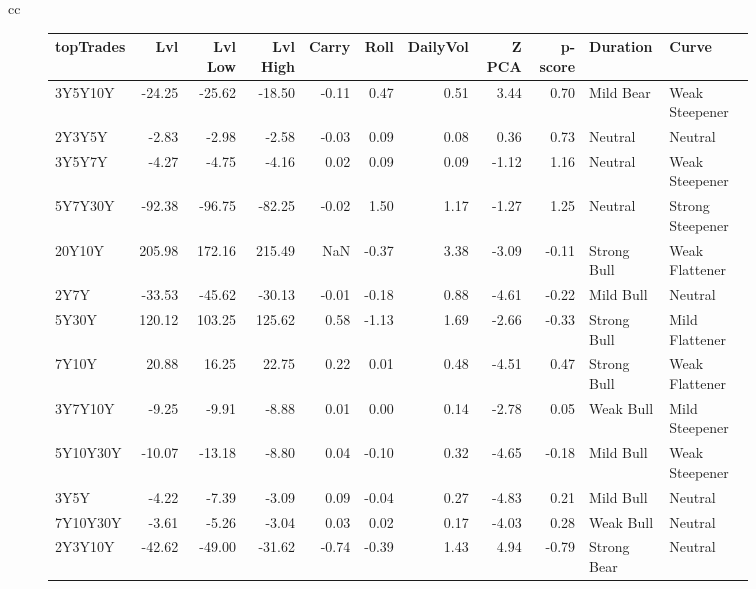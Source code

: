 \documentclass[a4paper,oneside]{report}
\begin{document}
\begin{figure}[htbp]
\begin{tabular}[c]{cc}
\begin{subfigure}[c]{0.5\textwidth}
\begin{adjustbox}{max width=\textwidth}
\begin{tabular}{lrrrrrrrrll}
\hline
topTrades &     Lvl &  Lvl Low &  Lvl High &  Carry &  Roll &  DailyVol &  Z PCA &  p-score &     Duration &             Curve \\
\hline
  3Y5Y10Y &  -24.25 &   -25.62 &    -18.50 &  -0.11 &  0.47 &      0.51 &   3.44 &     0.70 &    Mild Bear &    Weak Steepener \\
   2Y3Y5Y &   -2.83 &    -2.98 &     -2.58 &  -0.03 &  0.09 &      0.08 &   0.36 &     0.73 &      Neutral &           Neutral \\
   3Y5Y7Y &   -4.27 &    -4.75 &     -4.16 &   0.02 &  0.09 &      0.09 &  -1.12 &     1.16 &      Neutral &    Weak Steepener \\
  5Y7Y30Y &  -92.38 &   -96.75 &    -82.25 &  -0.02 &  1.50 &      1.17 &  -1.27 &     1.25 &      Neutral &  Strong Steepener \\
   20Y10Y &  205.98 &   172.16 &    215.49 &    NaN & -0.37 &      3.38 &  -3.09 &    -0.11 &  Strong Bull &    Weak Flattener \\
     2Y7Y &  -33.53 &   -45.62 &    -30.13 &  -0.01 & -0.18 &      0.88 &  -4.61 &    -0.22 &    Mild Bull &           Neutral \\
    5Y30Y &  120.12 &   103.25 &    125.62 &   0.58 & -1.13 &      1.69 &  -2.66 &    -0.33 &  Strong Bull &    Mild Flattener \\
    7Y10Y &   20.88 &    16.25 &     22.75 &   0.22 &  0.01 &      0.48 &  -4.51 &     0.47 &  Strong Bull &    Weak Flattener \\
  3Y7Y10Y &   -9.25 &    -9.91 &     -8.88 &   0.01 &  0.00 &      0.14 &  -2.78 &     0.05 &    Weak Bull &    Mild Steepener \\
 5Y10Y30Y &  -10.07 &   -13.18 &     -8.80 &   0.04 & -0.10 &      0.32 &  -4.65 &    -0.18 &    Mild Bull &    Weak Steepener \\
     3Y5Y &   -4.22 &    -7.39 &     -3.09 &   0.09 & -0.04 &      0.27 &  -4.83 &     0.21 &    Mild Bull &           Neutral \\
 7Y10Y30Y &   -3.61 &    -5.26 &     -3.04 &   0.03 &  0.02 &      0.17 &  -4.03 &     0.28 &    Weak Bull &           Neutral \\
  2Y3Y10Y &  -42.62 &   -49.00 &    -31.62 &  -0.74 & -0.39 &      1.43 &   4.94 &    -0.79 &  Strong Bear &           Neutral \\

\end{tabular}
\end{adjustbox}
\end{subfigure}
\end{tabular}
\end{figure}
\end{document}
